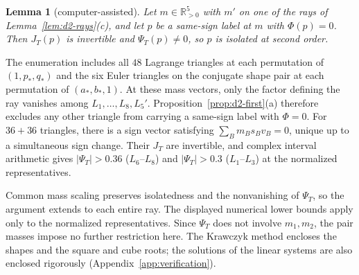 \documentclass[11pt]{amsart}
\newtheorem{lemma}[theorem]{Lemma}
\theoremstyle{definition}
\theoremstyle{remark}
\newcommand{\Rp}{\mathbb{R}_{>0}}
\begin{document}
\begin{lemma}[computer-assisted]\label{lem:d2-Lray}
Let $m\in\Rp^5$ with $m'$ on one of the rays of Lemma~\ref{lem:d2-rays}(c), and let $p$ be a
same-sign label at $m$ with $\Phi(p)=0$.  Then $J_T(p)$ is invertible and $\Psi_T(p)\ne0$, so $p$
is isolated at second order.
\end{lemma}

{The enumeration includes all $48$ Lagrange triangles at each
permutation of $(1,p_*,q_*)$ and the six Euler triangles on the conjugate shape pair at
each permutation of $(a_*,b_*,1)$.
At these mass vectors, only the factor defining the ray vanishes among
$L_1,\dots,L_8,L_5'$.  Proposition~\ref{prop:d2-first}(a) therefore excludes any other
triangle from carrying a same-sign label with $\Phi=0$.
For $36+36$ triangles, there is a sign vector satisfying $\sum_Bm_Bs_Bv_B=0$, unique up
to a simultaneous sign change.  Their $J_T$ are invertible, and complex interval
arithmetic gives $|\Psi_T|>0.36$ ($L_6$--$L_8$) and $|\Psi_T|>0.3$ ($L_1$--$L_3$) at the
normalized representatives.

Common mass scaling preserves isolatedness and the nonvanishing of $\Psi_T$, so the
argument extends to each entire ray.  The displayed numerical lower bounds apply only
to the normalized representatives.  Since $\Psi_T$ does not involve $m_1,m_2$, the pair
masses impose no further restriction here.
The Krawczyk method encloses the shapes and the square and cube roots; the solutions of
the linear systems are also enclosed rigorously (Appendix~\ref{app:verification}).}
\end{document}
